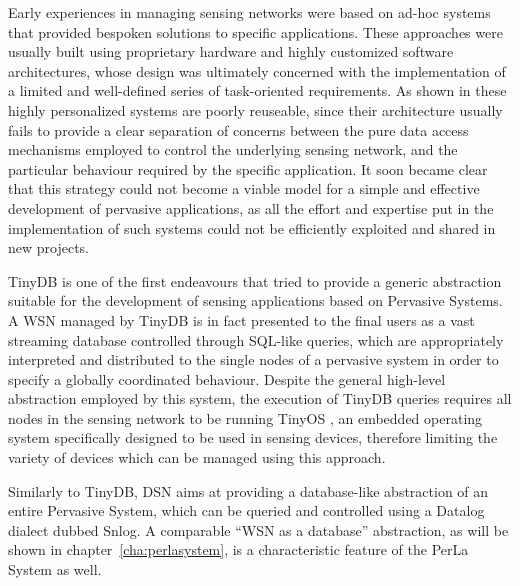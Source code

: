 Early experiences in managing sensing networks were based on ad-hoc systems
that provided bespoken solutions to specific applications. These approaches
were usually built using proprietary hardware and highly customized software
architectures, whose design was ultimately concerned with the implementation of
a limited and well-defined series of task-oriented requirements. As shown in
\cite{hartung2006firewxnet} \cite{mainwaring2002wireless}
\cite{werner2005monitoring} \cite{juang2002energy} these highly personalized
systems are poorly reuseable, since their architecture usually fails to provide
a clear separation of concerns between the pure data access mechanisms employed
to control the underlying sensing network, and the particular behaviour
required by the specific application. It soon became clear that this strategy
could not become a viable model for a simple and effective development of
pervasive applications, as all the effort and expertise put in the
implementation of such systems could not be efficiently exploited and shared in
new projects.

TinyDB \cite{madden2005tinydb} is one of the first endeavours that tried to
provide a generic abstraction suitable for the development of sensing
applications based on Pervasive Systems. A WSN managed by TinyDB is in fact
presented to the final users as a vast streaming database controlled through
SQL-like queries, which are appropriately interpreted and distributed to the
single nodes of a pervasive system in order to specify a globally coordinated
behaviour. Despite the general high-level abstraction employed by this system,
the execution of TinyDB queries requires all nodes in the sensing network to be
running TinyOS \cite{levis2005tinyos}, an embedded operating system
specifically designed to be used in sensing devices, therefore limiting the
variety of devices which can be managed using this approach.

Similarly to TinyDB, DSN \cite{chu2006entirely} aims at providing a
database-like abstraction of an entire Pervasive System, which can be queried
and controlled using a Datalog dialect dubbed Snlog. A comparable ``WSN as a
database'' abstraction, as will be shown in chapter~\ref{cha:perlasystem}, is a
characteristic feature of the PerLa System as well.

